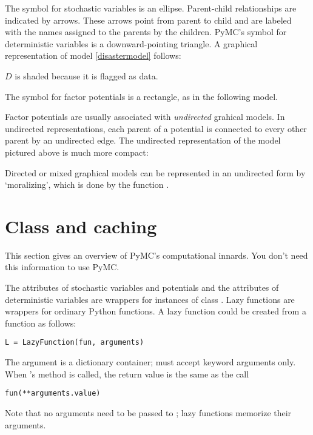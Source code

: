 The symbol for stochastic variables is an ellipse. Parent-child relationships are indicated by arrows. These arrows point from parent to child and are labeled with the names assigned to the parents by the children. PyMC's symbol for deterministic variables is a downward-pointing triangle. A graphical representation of model \ref{disastermodel} follows:
\begin{center}
\end{center}
$D$ is shaded because it is flagged as data.


The symbol for factor potentials is a rectangle, as in the following model.
\begin{center}
\end{center}
Factor potentials are usually associated with \emph{undirected} grahical models. In undirected representations, each parent of a potential is connected to every other parent by an undirected edge. The undirected representation of the model pictured above is much more compact:
\begin{center}
\end{center}
Directed or mixed graphical models can be represented in an undirected form by `moralizing', which is done by the function .


\section*{Class  and caching}
\label{sec:caching} 
This section gives an overview of PyMC's computational innards. You don't need this information to use PyMC.

The  attributes of stochastic variables and potentials and the  attributes of deterministic variables are wrappers for instances of class . Lazy functions are wrappers for ordinary Python functions. A lazy function  could be created from a function  as follows:
\begin{verbatim}
L = LazyFunction(fun, arguments)
\end{verbatim}
The argument  is a dictionary container;  must accept keyword arguments only. When 's  method is called, the return value is the same as the call 
\begin{verbatim}
fun(**arguments.value)
\end{verbatim}
Note that no arguments need to be passed to ; lazy functions memorize their arguments.

